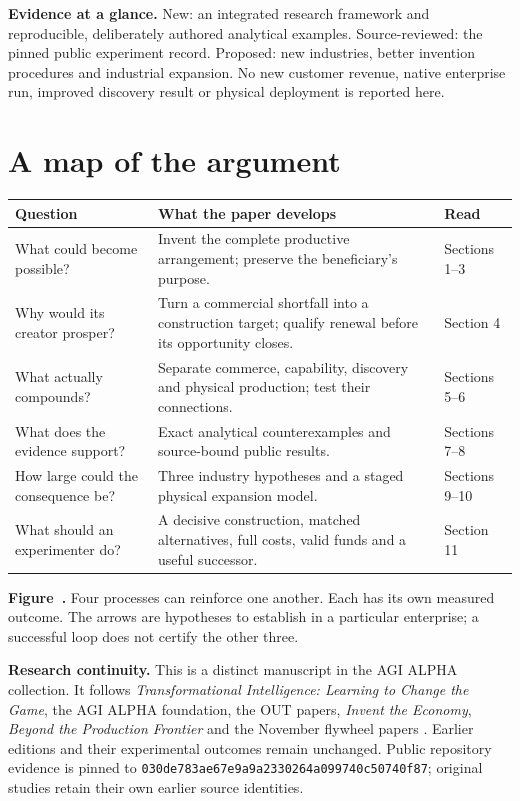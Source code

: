 \documentclass[11pt,letterpaper]{article}
\begin{document}
\textbf{Evidence at a glance.} New: an integrated research framework and reproducible, deliberately authored analytical examples. Source-reviewed: the pinned public experiment record. Proposed: new industries, better invention procedures and industrial expansion. No new customer revenue, native enterprise run, improved discovery result or physical deployment is reported here.

\clearpage
\section*{A map of the argument}
\begin{tabularx}{\linewidth}{@{}P{3.0cm}YP{2.0cm}@{}}\toprule
Question & What the paper develops & Read\\\midrule
What could become possible? & Invent the complete productive arrangement; preserve the beneficiary's purpose. & Sections 1--3\\
Why would its creator prosper? & Turn a commercial shortfall into a construction target; qualify renewal before its opportunity closes. & Section 4\\
What actually compounds? & Separate commerce, capability, discovery and physical production; test their connections. & Sections 5--6\\
What does the evidence support? & Exact analytical counterexamples and source-bound public results. & Sections 7--8\\
How large could the consequence be? & Three industry hypotheses and a staged physical expansion model. & Sections 9--10\\
What should an experimenter do? & A decisive construction, matched alternatives, full costs, valid funds and a useful successor. & Section 11\\\bottomrule
\end{tabularx}

\vspace{7mm}
\label{fig:loops}

\vspace{3mm}
{\small\textbf{Figure~\thefigure.} Four processes can reinforce one another. Each has its own measured outcome. The arrows are hypotheses to establish in a particular enterprise; a successful loop does not certify the other three.}

\vfill
\textbf{Research continuity.} This is a distinct manuscript in the AGI ALPHA collection. It follows \emph{Transformational Intelligence: Learning to Change the Game}, the AGI ALPHA foundation, the OUT papers, \emph{Invent the Economy}, \emph{Beyond the Production Frontier} and the November flywheel papers \cite{ti,foundation,economy,frontier,flywheel11,report20261102}. Earlier editions and their experimental outcomes remain unchanged. Public repository evidence is pinned to \nolinkurl{030de783ae67e9a9a2330264a099740c50740f87}; original studies retain their own earlier source identities.
\end{document}
